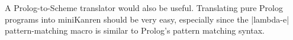 A Prolog-to-Scheme translator would also be useful.  Translating pure
Prolog programs into miniKanren should be very easy, especially since
the \scheme|lambda-e| pattern-matching macro is similar to Prolog's
pattern matching syntax.





